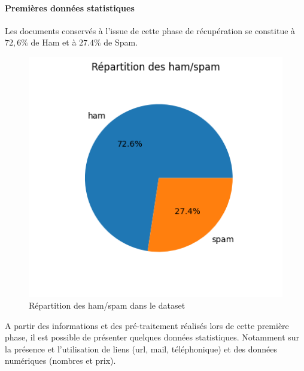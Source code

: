 \documentclass[a4paper,12pt]{article}
\begin{document}
				
		\paragraph{Premières données statistiques}
			Les documents conservés à l'issue de cette phase de récupération se constitue à $72,6\%$ de Ham et à $27.4\%$ de Spam.
			
			\begin{figure}[H]
				\centering
				\includegraphics[scale=1]{img/hamSpam.png}
				\caption{Répartition des ham/spam dans le dataset}
			\end{figure}
			
			A partir des informations et des pré-traitement réalisés lors de cette première phase, il est possible de présenter quelques données statistiques. Notamment sur la présence et l'utilisation de liens (url, mail, téléphonique) et des données numériques (nombres et prix).\\
\end{document}
